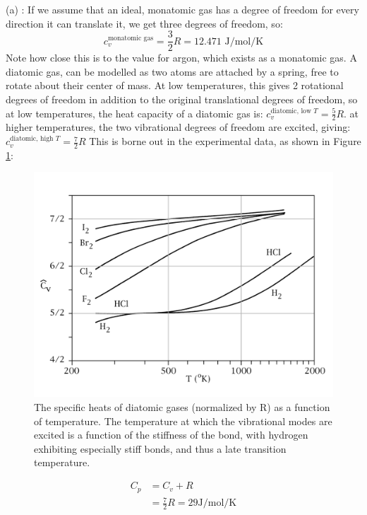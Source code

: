 \documentclass[12pt]{article}
\begin{document}
(a) : If we assume that an ideal, monatomic gas has a degree of freedom for every direction it can translate it, we get three degrees of freedom, so:
\begin{equation}
c_v^{\text{monatomic gas}} = \frac{3}{2} R = 12.471 \text{ J/mol/K}
\end{equation}
Note how close this is to the value for argon, which exists as a monatomic gas.   %
A diatomic gas, can be modelled as two atoms are attached by a spring, free to rotate about their center of mass. At low temperatures, this gives 2 rotational degrees of freedom in addition to the original translational degrees of freedom, so at low temperatures, the heat capacity of a diatomic gas is: $c_v^{\text{diatomic, low }T} = \frac{5}{2} R$.
at higher temperatures, the two vibrational degrees of freedom are excited, giving: $c_v^{\text{diatomic, high }T} = \frac{7}{2} R$
This is borne out in the experimental data, as shown in Figure \ref{CPofgases}:
\begin{figure}[h]
\label{CPofgases}
\centering
\includegraphics[width=\textwidth]{DiatomicSpecHeat2}
\caption{The specific heats of diatomic gases (normalized by R) as a function of temperature. The temperature at which the vibrational modes are excited is a function of the stiffness of the bond, with hydrogen exhibiting especially stiff bonds, and thus a late transition temperature.}
\end{figure}

\begin{align*}
C_p &= C_v + R\\
&= \frac{7}{2} R =  29 \text{J}/\text{mol}/\text{K}
\end{align*}
\end{document}
